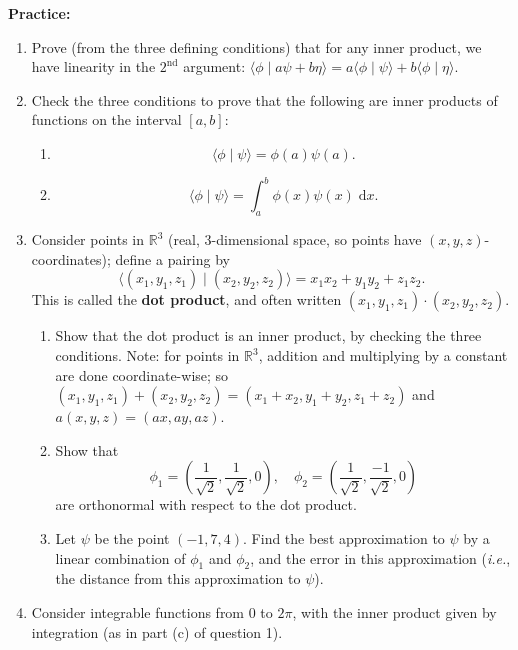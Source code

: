 \documentclass{article}
\newcommand{\diff}{\;\mathrm{d}}
\begin{document}
	
	
	
	
	




\clearpage

\textbf{Practice:}\bigskip



\begin{enumerate}
	\item Prove (from the three defining conditions) that for any inner product, we have linearity in the $2^\mathrm{nd}$ argument: $\langle \phi\mid a\psi+b\eta\rangle= a\langle\phi\mid\psi\rangle + b\langle\phi\mid\eta\rangle$.
	\item Check the three conditions to prove that the following are inner products of functions on the interval $[a,b]$:
		\begin{enumerate}
			\item \[\langle \phi\mid\psi\rangle = \phi(a)\psi(a).\]
			\item \[\langle\phi\mid\psi\rangle = \int_a^b \phi(x)\psi(x)\diff x.\]
		\end{enumerate}
	\item Consider points in $\mathbb{R}^3$ (real, 3-dimensional space, so points have $(x,y,z)$-coordinates); define a pairing by
		\[\langle (x_1,y_1,z_1)\mid(x_2,y_2,z_2)\rangle=x_1x_2 + y_1y_2 +z_1z_2.\]
		This is called the \textbf{dot product}, and often written $(x_1,y_1,z_1)\cdot(x_2,y_2,z_2)$.
		\begin{enumerate}
			\item Show that the dot product is an inner product, by checking the three conditions. Note: for points in $\mathbb{R}^3$, addition and multiplying by a constant are done coordinate-wise; so $(x_1,y_1,z_1)+(x_2,y_2,z_2)=(x_1+x_2,y_1+y_2,z_1+z_2)$ and $a(x,y,z)=(ax,ay,az)$.
			\item Show that
				\[\phi_1=\left(\frac{1}{\sqrt{2}},\frac{1}{\sqrt{2}},0\right),\quad \phi_2=\left(\frac{1}{\sqrt{2}},\frac{-1}{\sqrt{2}},0\right)\]
				are orthonormal with respect to the dot product.
			\item Let $\psi$ be the point $(-1,7,4)$. Find the best approximation to $\psi$ by a linear combination of $\phi_1$ and $\phi_2$, and the error in this approximation (\textit{i.e.}, the distance from this approximation to $\psi$).
		\end{enumerate}
	\item Consider integrable functions from $0$ to $2\pi$, with the inner product given by integration (as in part (c) of question 1).

\end{enumerate}
\end{document}
